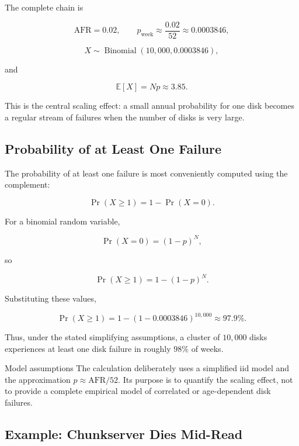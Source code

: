 \documentclass[11pt,a4paper,oneside]{book}
\begin{document}
The complete chain is

\[
\mathrm{AFR}=0.02,
\qquad
p_{\text{week}}\approx\frac{0.02}{52}\approx0.0003846,
\]

\[
X\sim\operatorname{Binomial}(10{,}000,0.0003846),
\]

and

\[
\mathbb{E}[X]=Np\approx3.85.
\]

This is the central scaling effect: a small annual probability for one disk becomes a regular stream of failures when the number of disks is very large.

\subsection{Probability of at Least One Failure}

The probability of at least one failure is most conveniently computed using the complement:

\begin{equation}
\Pr(X\geq 1)
=
1-\Pr(X=0).
\label{eq:at-least-one}
\end{equation}

For a binomial random variable,

\[
\Pr(X=0)=(1-p)^N,
\]

so

\begin{equation}
\Pr(X\geq 1)
=
1-(1-p)^N.
\label{eq:at-least-one-binomial}
\end{equation}

Substituting these values,

\[
\Pr(X\geq 1)
=
1-(1-0.0003846)^{10{,}000}
\approx 97.9\%.
\]

Thus, under the stated simplifying assumptions, a cluster of \(10{,}000\) disks experiences at least one disk failure in roughly \(98\%\) of weeks.

\begin{remarkbox}{Model assumptions}
The calculation deliberately uses a simplified iid model and the approximation \(p\approx \mathrm{AFR}/52\). Its purpose is to quantify the scaling effect, not to provide a complete empirical model of correlated or age-dependent disk failures.
\end{remarkbox}

\subsection{Example: Chunkserver Dies Mid-Read}
\end{document}
